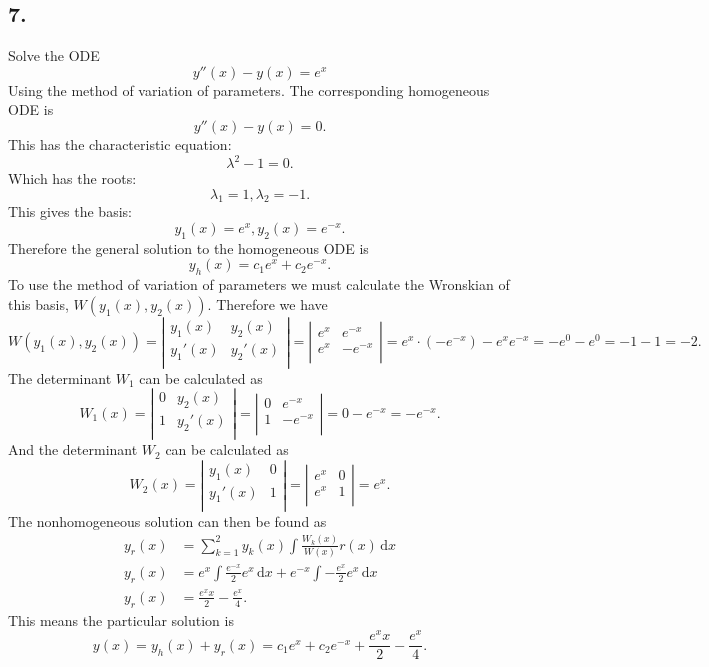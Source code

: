 \subsection*{7.} Solve the ODE
\[ 
y''(x) - y(x) = e^{x}
\]
Using the method of variation of parameters.
\bigbreak
The corresponding homogeneous ODE is
\[ 
y''(x) - y(x) = 0
.\]
This has the characteristic equation:
\[ 
\lambda^2 - 1 = 0
.\]
Which has the roots:
\[ 
\lambda_1 = 1, \lambda_2 = -1
.\]
This gives the basis:
\[ 
y_1(x) = e^{x}, y_2(x) = e^{-x}
.\]
Therefore the general solution to the homogeneous ODE is
\[ 
y_h(x) = c_1 e^{x} + c_2 e^{-x}
.\]
To use the method of variation of parameters we must calculate the Wronskian of this basis, $W(y_1(x), y_2(x))$. Therefore we have
\[ 
W(y_1(x), y_2(x)) = \left| \begin{array}{cc}
y_1(x) & y_2(x)\\
y_1'(x) & y_2'(x)\\
\end{array} \right| = \left| \begin{array}{cc}
 e^{x} & e^{-x}\\
 e^{x} & -e^{-x}\\
\end{array} \right| = e^{x} \cdot (-e^{-x}) - e^{x} e^{-x} = -e^{0} - e^{0} = -1 - 1 = -2
.\]
The determinant $W_1$ can be calculated as
\[ 
W_1(x) = \left| \begin{array}{cc}
0 & y_2(x) \\
1 & y_2'(x) \\
\end{array} \right| = \left| \begin{array}{cc}
0 & e^{-x}\\
1 & - e^{-x}\\
\end{array} \right| = 0 - e^{-x} = - e^{-x}
.\]
And the determinant $W_2$ can be calculated as
\[ 
W_2(x) = \left| \begin{array}{cc}
y_1(x) & 0\\
y_1'(x) & 1\\
\end{array} \right| = \left| \begin{array}{cc}
e^{x} & 0\\
e^{x} & 1\\
\end{array} \right| = e^{x}
.\]
The nonhomogeneous solution can then be found as
\begin{align*}
  y_r(x) &= \sum_{k = 1}^{2} y_k(x) \int \frac{W_k(x)}{W(x)} r(x) \, \mathrm{d}x  \\
  y_r(x) &= e^{x} \int \frac{e^{-x}}{2} e^{x} \, \mathrm{d}x  + e^{-x} \int - \frac{e^{x}}{2} e^{x} \, \mathrm{d}x  \\
  y_r(x) &= \frac{e^{x} x}{2} - \frac{e^{x}}{4}
.\end{align*}
This means the particular solution is
\[ 
y(x) = y_h(x) + y_r(x) = c_1 e^{x} + c_2 e^{-x} + \frac{e^{x} x}{2} - \frac{e^{x}}{4}
.\]


